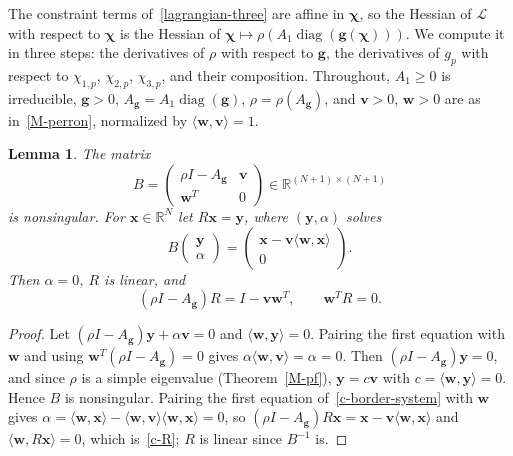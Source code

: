 \documentclass[11pt]{article}
\theoremstyle{plain}
\newtheorem{lemma}[theorem]{Lemma}
\theoremstyle{remark}
\numberwithin{equation}{section}
\begin{document}
The constraint terms of~\eqref{lagrangian-three} are affine in $\bm\chi$, so
the Hessian of $\mathcal{L}$ with respect to $\bm\chi$ is the Hessian of
$\bm\chi\mapsto\rho\left(A_1\operatorname{diag}\left(\bm g(\bm\chi)\right)\right)$.
We compute it in three steps: the derivatives of $\rho$ with respect to
$\bm g$, the derivatives of $g_p$ with respect to $\chi_{1,p}$, $\chi_{2,p}$,
$\chi_{3,p}$, and their composition. Throughout, $A_1\ge 0$ is irreducible,
$\bm g>0$, $A_{\bm g}=A_1\operatorname{diag}(\bm g)$, $\rho=\rho(A_{\bm g})$, and $\bm v>0$,
$\bm w>0$ are as in~\eqref{M-perron}, normalized by $\langle\bm w,\bm v\rangle=1$.

\begin{lemma}\label{c-border}
The matrix
\begin{equation}\label{c-border-matrix}
B=\begin{pmatrix}\rho I-A_{\bm g}&\bm v\\ \bm w^T&0\end{pmatrix}\in\mathbb{R}^{(N+1)\times(N+1)}
\end{equation}
is nonsingular. For $\bm x\in\mathbb{R}^N$ let $R\bm x=\bm y$, where $(\bm y,\alpha)$
solves
\begin{equation}\label{c-border-system}
B\begin{pmatrix}\bm y\\ \alpha\end{pmatrix}
=\begin{pmatrix}\bm x-\bm v\langle\bm w,\bm x\rangle\\ 0\end{pmatrix}.
\end{equation}
Then $\alpha=0$, $R$ is linear, and
\begin{equation}\label{c-R}
(\rho I-A_{\bm g})R=I-\bm v\bm w^T,\qquad \bm w^TR=0 .
\end{equation}
\end{lemma}
\begin{proof}
Let $(\rho I-A_{\bm g})\bm y+\alpha\bm v=0$ and $\langle\bm w,\bm y\rangle=0$. Pairing
the first equation with $\bm w$ and using $\bm w^T(\rho I-A_{\bm g})=0$ gives
$\alpha\langle\bm w,\bm v\rangle=\alpha=0$. Then $(\rho I-A_{\bm g})\bm y=0$, and since
$\rho$ is a simple eigenvalue (Theorem~\ref{M-pf}), $\bm y=c\bm v$ with
$c=\langle\bm w,\bm y\rangle=0$. Hence $B$ is nonsingular. Pairing the first
equation of~\eqref{c-border-system} with $\bm w$ gives
$\alpha=\langle\bm w,\bm x\rangle-\langle\bm w,\bm v\rangle\langle\bm w,\bm x\rangle=0$,
so $(\rho I-A_{\bm g})R\bm x=\bm x-\bm v\langle\bm w,\bm x\rangle$ and
$\langle\bm w,R\bm x\rangle=0$, which is~\eqref{c-R}; $R$ is linear since
$B^{-1}$ is.
\end{proof}
\end{document}
